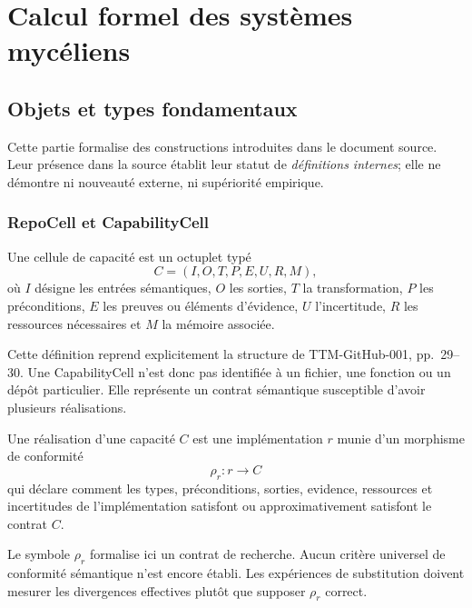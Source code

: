 \part{Calcul formel des systèmes mycéliens}

\chapter{Objets et types fondamentaux}

Cette partie formalise des constructions introduites dans le document source. Leur présence dans la source établit leur statut de \emph{définitions internes}; elle ne démontre ni nouveauté externe, ni supériorité empirique.

\section{RepoCell et CapabilityCell}

\begin{definition}[CapabilityCell]
Une cellule de capacité est un octuplet typé
\[
C=(I,O,T,P,E,U,R,M),
\]
où $I$ désigne les entrées sémantiques, $O$ les sorties, $T$ la transformation, $P$ les préconditions, $E$ les preuves ou éléments d'évidence, $U$ l'incertitude, $R$ les ressources nécessaires et $M$ la mémoire associée.
\end{definition}

Cette définition reprend explicitement la structure de TTM-GitHub-001, pp.~29--30. Une CapabilityCell n'est donc pas identifiée à un fichier, une fonction ou un dépôt particulier. Elle représente un contrat sémantique susceptible d'avoir plusieurs réalisations.

\begin{definition}[Réalisation]
Une réalisation d'une capacité $C$ est une implémentation $r$ munie d'un morphisme de conformité
\[
\rho_r:r\longrightarrow C
\]
qui déclare comment les types, préconditions, sorties, evidence, ressources et incertitudes de l'implémentation satisfont ou approximativement satisfont le contrat $C$.
\end{definition}

\begin{limitation}
Le symbole $\rho_r$ formalise ici un contrat de recherche. Aucun critère universel de conformité sémantique n'est encore établi. Les expériences de substitution doivent mesurer les divergences effectives plutôt que supposer $\rho_r$ correct.
\end{limitation}

